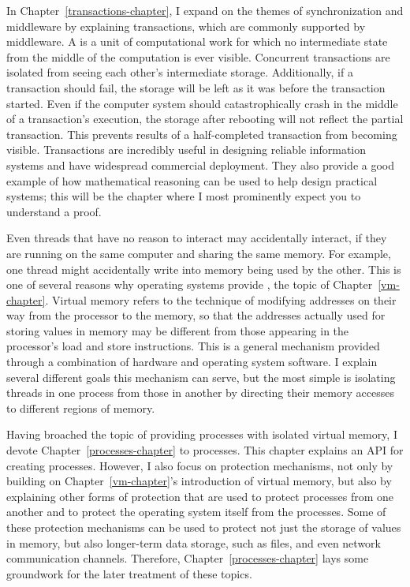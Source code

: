 In Chapter~\ref{transactions-chapter}, I expand on the themes of
synchronization and middleware by explaining transactions, which are
commonly supported by middleware.  A  is a unit of
computational work for which no intermediate state from the middle of
the computation is ever visible.  Concurrent transactions are isolated
from seeing each other's intermediate storage.  Additionally, if a
transaction should fail, the storage will be left as it was before the
transaction started.
Even if the computer system should catastrophically crash in the middle of a transaction's execution, the storage after rebooting will not reflect the partial transaction.
This prevents results of a half-completed
transaction from becoming visible.  Transactions are incredibly useful
in designing reliable information systems and have widespread
commercial deployment.  They also provide a good example of how
mathematical reasoning can be used to help design practical systems;
this will be the chapter where I most prominently expect you to
understand a proof.

Even threads that have no reason to interact may accidentally
interact, if they are running on the same computer and sharing the same
memory.  For example, one thread might accidentally write into memory being used by
the other.  This is one of several reasons why operating systems
provide , the topic of
Chapter~\ref{vm-chapter}.  Virtual memory refers to the technique of
modifying addresses on their way from the processor to the memory, so
that the addresses actually used for storing values in memory may be
different from those appearing in the processor's load and store
instructions.  This is a general mechanism provided through a
combination of hardware and operating system software.  I explain
several different goals this mechanism can serve, but the most
simple is isolating threads in one process from those in another by
directing their memory accesses to different regions of memory.

Having broached the topic of providing processes with isolated virtual
memory, I devote
Chapter~\ref{processes-chapter} to processes.  This chapter explains an API for
creating processes.  However, I also focus on protection
mechanisms, not only by building on Chapter~\ref{vm-chapter}'s introduction
of virtual memory, but also by explaining other forms of protection
that are
used to protect processes from one another and to protect the
operating system itself from the processes.  Some of these protection
mechanisms can be used to protect not just the storage of values in memory,
but also longer-term data storage, such as files, and even network
communication channels.  Therefore, Chapter~\ref{processes-chapter}
lays some groundwork for the later treatment of these topics.


